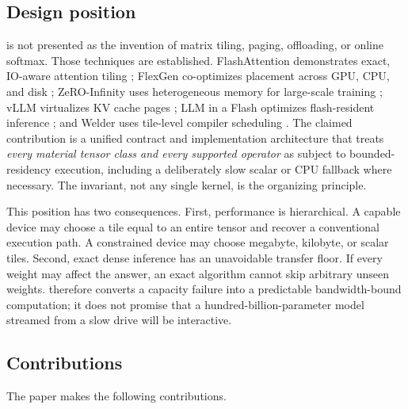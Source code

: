 \subsection{Design position}

\AMS is not presented as the invention of matrix tiling, paging, offloading, or online softmax. Those techniques are established. FlashAttention demonstrates exact, IO-aware attention tiling \cite{dao2022flashattention}; FlexGen co-optimizes placement across GPU, CPU, and disk \cite{sheng2023flexgen}; ZeRO-Infinity uses heterogeneous memory for large-scale training \cite{rajbhandari2021zeroinfinity}; vLLM virtualizes KV cache pages \cite{kwon2023pagedattention}; LLM in a Flash optimizes flash-resident inference \cite{alizadeh2023llmflash}; and Welder uses tile-level compiler scheduling \cite{shi2023welder}. The claimed contribution is a unified contract and implementation architecture that treats \emph{every material tensor class and every supported operator} as subject to bounded-residency execution, including a deliberately slow scalar or CPU fallback where necessary. The invariant, not any single kernel, is the organizing principle.

This position has two consequences. First, performance is hierarchical. A capable device may choose a tile equal to an entire tensor and recover a conventional execution path. A constrained device may choose megabyte, kilobyte, or scalar tiles. Second, exact dense inference has an unavoidable transfer floor. If every weight may affect the answer, an exact algorithm cannot skip arbitrary unseen weights. \AMS therefore converts a capacity failure into a predictable bandwidth-bound computation; it does not promise that a hundred-billion-parameter model streamed from a slow drive will be interactive.

\subsection{Contributions}

The paper makes the following contributions.

